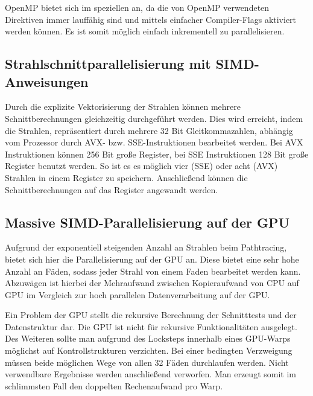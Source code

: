 OpenMP bietet sich im speziellen an, da die von OpenMP verwendeten Direktiven immer lauffähig sind und mittels einfacher Compiler-Flags aktiviert werden können. Es ist somit möglich einfach inkrementell zu parallelisieren. 

\subsection{Strahlschnittparallelisierung mit SIMD-Anweisungen}
\label{sec:sse}
Durch die explizite Vektorisierung der Strahlen können mehrere Schnittberechnungen gleichzeitig durchgeführt werden. Dies wird erreicht, indem die Strahlen, repräsentiert durch mehrere 32 Bit Gleitkommazahlen, abhängig vom Prozessor durch AVX- bzw. SSE-Instruktionen bearbeitet werden. Bei AVX Instruktionen können 256 Bit große Register, bei SSE Instruktionen 128 Bit große Register benutzt werden. So ist es es möglich vier (SSE) oder acht (AVX) Strahlen in einem Register zu speichern. Anschließend können die Schnittberechnungen auf das Register angewandt werden. 

\subsection{Massive SIMD-Parallelisierung auf der GPU}
Aufgrund der exponentiell steigenden Anzahl an Strahlen beim Pathtracing, bietet sich hier die Parallelisierung auf der GPU an. Diese bietet eine sehr hohe Anzahl an Fäden, sodass jeder Strahl von einem Faden bearbeitet werden kann. Abzuwägen ist hierbei der Mehraufwand zwischen Kopieraufwand von CPU auf GPU im Vergleich zur hoch parallelen Datenverarbeitung auf der GPU. 

Ein Problem der GPU stellt die rekursive Berechnung der Schnitttests und der Datenstruktur dar. Die GPU ist nicht für rekursive Funktionalitäten ausgelegt. Des Weiteren sollte man aufgrund des Locksteps innerhalb eines GPU-Warps möglichst auf Kontrollstrukturen verzichten. Bei einer bedingten Verzweigung müssen beide möglichen Wege von allen 32 Fäden durchlaufen werden. Nicht verwendbare Ergebnisse werden anschließend verworfen. Man erzeugt somit im schlimmsten Fall den doppelten Rechenaufwand pro Warp. 